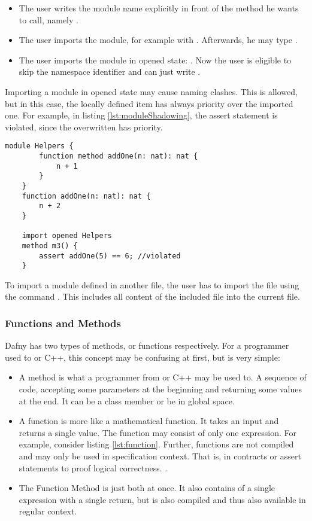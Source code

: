 \begin{itemize}
    \item The user writes the module name explicitly in front of the method he wants to call, \linebreak namely .
    \item The user imports the module, for example with . Afterwards, he may type .
    \item The user imports the module in opened state: . Now the user is eligible to skip the namespace identifier and can just write .
\end{itemize}

Importing a module in opened state may cause naming clashes. This is allowed, but in this case, the locally defined item has always priority over the imported one. For example, in listing \ref{lst:moduleShadowing}, the assert statement is violated, since the overwritten  has priority. \cite{functionVSMethod}

\begin{lstlisting}[language = dafny, caption={Naming Clash}, captionpos=b, label={lst:moduleShadowing}]
    module Helpers {
        function method addOne(n: nat): nat {
            n + 1
        }
    }
    function addOne(n: nat): nat {
        n + 2
    }

    import opened Helpers
    method m3() {
        assert addOne(5) == 6; //violated
    }

\end{lstlisting}

To import a module defined in another file, the user has to import the file using the command . This includes all content of the included file into the current file.

\subsubsection{Functions and Methods}
Dafny has two types of methods, or functions respectively. For a programmer used to \Csharp or C++, this concept may be confusing at first, but is very simple:
\begin{itemize}
\item A method is what a programmer from \Csharp or C++ may be used to. A sequence of code, accepting some parameters at the beginning and returning some values at the end. It can be a class member or be in global space.
\item A function is more like a mathematical function. It takes an input and returns a single value. The function may consist of only one expression. For example, consider listing \ref{lst:function}. Further, functions are not compiled and may only be used in specification context. That is, in contracts or assert statements to proof logical correctness. \cite{functionVSMethod}.
\item The Function Method is just both at once. It also contains of a single expression with a single return, but is also compiled and thus also available in regular context. \cite{functionVSMethod}
\end{itemize}

